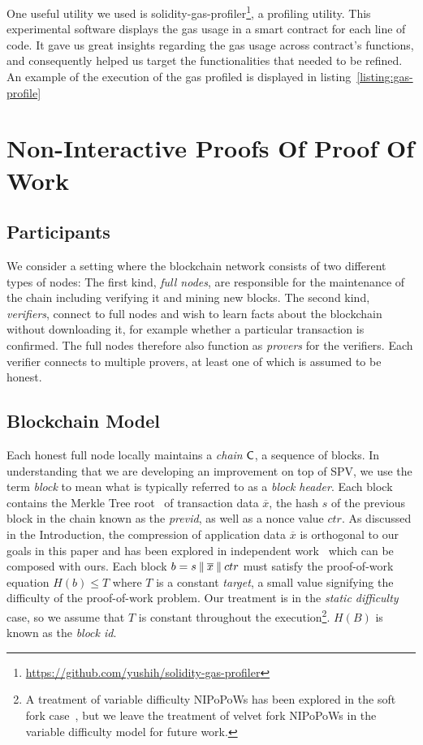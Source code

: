 One useful utility we used is
solidity-gas-profiler\footnote{\url{https://github.com/yushih/solidity-gas-profiler}},
a profiling utility. This experimental software displays the gas usage in a
smart contract for each line of code. It gave us great insights regarding the
gas usage across contract’s functions, and consequently helped us target the
functionalities that needed to be refined. An example of the execution of the
gas profiled is displayed in listing~\ref{listing:gas-profile}



\section{Non-Interactive Proofs Of Proof Of Work}

\subsection{Participants}

We consider a setting where the blockchain network consists of two different
types of nodes: The first kind, \emph{full nodes}, are responsible for the
maintenance of the chain including verifying it and mining new blocks. The
second kind, \emph{verifiers}, connect to full nodes and wish to learn facts
about the blockchain without downloading it, for example whether a particular
transaction is confirmed. The full nodes therefore also function as
\emph{provers} for the verifiers. Each verifier connects to multiple provers, at
least one of which is assumed to be honest.

\subsection{Blockchain Model} Each honest full node locally maintains a \emph{chain}
$\mathsf{C}$, a sequence of blocks. In understanding that we are developing an
improvement on top of SPV, we use the term \emph{block} to mean what is
typically referred to as a \emph{block header}. Each block contains the Merkle
Tree root~\cite{merkle} of transaction data $\overline{x}$, the hash $s$ of the
previous block in the chain known as the \emph{previd}, as well as a nonce
value $ctr$. As discussed in the Introduction, the compression of application
data $\overline{x}$ is orthogonal to our goals in this paper and has been
explored in independent work~\cite{edrax} which can be composed with ours. Each
block $b = s \mathbin{\|} \overline{x} \mathbin{\|} ctr$ must satisfy the
proof-of-work~\cite{pow} equation $H(b) \leq T$ where $T$ is a constant
\emph{target}, a small value signifying the difficulty of the proof-of-work
problem. Our treatment is in the \emph{static difficulty} case, so we assume
that $T$ is constant throughout the execution\footnote{A treatment of variable
    difficulty NIPoPoWs has been explored in the soft fork
    case~\cite{dionyziz}, but we leave the treatment of velvet fork NIPoPoWs in
    the variable difficulty model for future work.}. $H(B)$ is known as the
    \emph{block id}.

